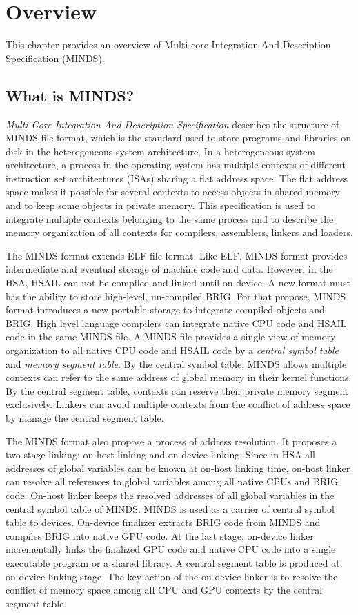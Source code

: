 \section {Overview}
This chapter provides an overview of Multi-core Integration And Description Specification (MINDS).

\subsection{What is MINDS?}
{\em Multi-Core Integration And Description Specification} describes the structure of MINDS file format, which is the standard used to store programs and libraries on disk in the heterogeneous system architecture. In a heterogeneous system architecture, a process in the operating system has multiple contexts of different instruction set architectures (ISAs) sharing a flat address space. The flat address space makes it possible for several contexts to access objects in shared memory and to keep some objects in private memory. This specification is used to integrate multiple contexts belonging to the same process and to describe the memory organization of all contexts for compilers, assemblers, linkers and loaders.

The MINDS format extends ELF file format. Like ELF, MINDS format provides intermediate and eventual storage of machine code and data. However, in the HSA, HSAIL can not be compiled and linked until on device. A new format must has the ability to store high-level, un-compiled BRIG. For that propose, MINDS format introduces a new portable storage to integrate compiled objects and BRIG. High level language compilers can integrate native CPU code and HSAIL code in the same MINDS file. A MINDS file provides a single view of memory organization to all native CPU code and HSAIL code by a {\em central symbol table } and {\em memory segment table}. By the central symbol table, MINDS allows multiple contexts can refer to the same address of global memory in their kernel functions. By the central segment table, contexts can reserve their private memory segment exclusively. Linkers can avoid multiple contexts from the conflict of address space by manage the central segment table.

The MINDS format also propose a process of address resolution. It proposes a two-stage linking: on-host linking and on-device linking. Since in HSA all addresses of global variables can be known at on-host linking time, on-host linker can resolve all references to global variables among all native CPUs and BRIG code. On-host linker keeps the resolved addresses of all global variables in the central symbol table of MINDS. MINDS is used as a carrier of central symbol table to devices. On-device finalizer extracts BRIG code from MINDS and compiles BRIG into native GPU code. At the last stage, on-device linker incrementally links the finalized GPU code and native CPU code into a single executable program or a shared library. A central segment table is produced at on-device linking stage. The key action of the on-device linker is to resolve the conflict of memory space among all CPU and GPU contexts by the central segment table.

